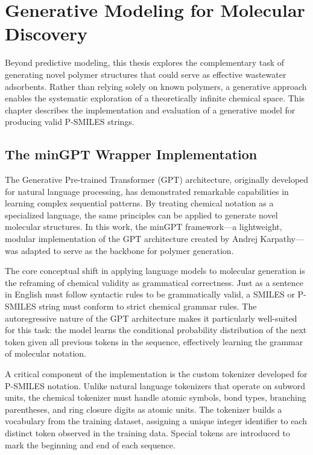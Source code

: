 \chapter{Generative Modeling for Molecular Discovery}
\label{chap4}

Beyond predictive modeling, this thesis explores the complementary task of generating novel polymer structures that could serve as effective wastewater adsorbents. Rather than relying solely on known polymers, a generative approach enables the systematic exploration of a theoretically infinite chemical space. This chapter describes the implementation and evaluation of a generative model for producing valid P-SMILES strings.

\section{The minGPT Wrapper Implementation}
\label{sec:mingpt_wrapper}

The Generative Pre-trained Transformer (GPT) architecture, originally developed for natural language processing, has demonstrated remarkable capabilities in learning complex sequential patterns. By treating chemical notation as a specialized language, the same principles can be applied to generate novel molecular structures. In this work, the minGPT framework—a lightweight, modular implementation of the GPT architecture created by Andrej Karpathy—was adapted to serve as the backbone for polymer generation.

The core conceptual shift in applying language models to molecular generation is the reframing of chemical validity as grammatical correctness. Just as a sentence in English must follow syntactic rules to be grammatically valid, a SMILES or P-SMILES string must conform to strict chemical grammar rules. The autoregressive nature of the GPT architecture makes it particularly well-suited for this task: the model learns the conditional probability distribution of the next token given all previous tokens in the sequence, effectively learning the grammar of molecular notation.

A critical component of the implementation is the custom tokenizer developed for P-SMILES notation. Unlike natural language tokenizers that operate on subword units, the chemical tokenizer must handle atomic symbols, bond types, branching parentheses, and ring closure digits as atomic units. The tokenizer builds a vocabulary from the training dataset, assigning a unique integer identifier to each distinct token observed in the training data. Special tokens are introduced to mark the beginning and end of each sequence.

